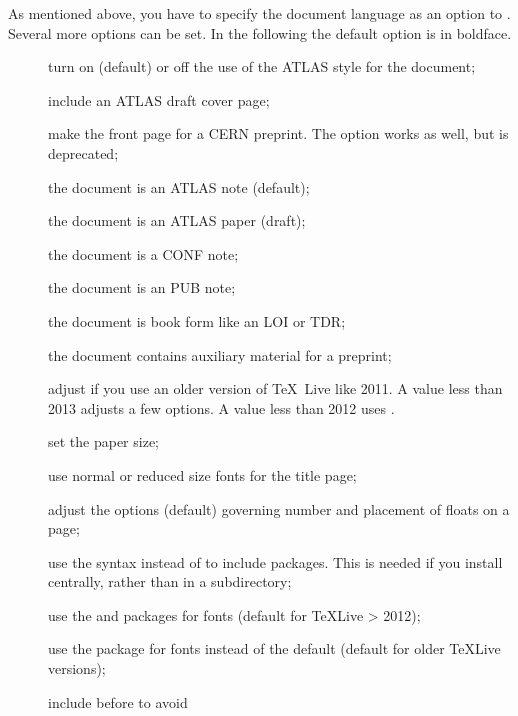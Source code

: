 As mentioned above, you have to specify the document language as an option to .
Several more options can be set.
In the following the default option is in boldface.
\begin{description}
\item[] turn on (default) or off the use of the ATLAS style for the document;
\item[] include an ATLAS draft cover page;
\item[] make the front page for a CERN preprint.
  The option  works as well, but is deprecated;
\item[] the document is an ATLAS note (default);
\item[] the document is an ATLAS paper (draft);
\item[] the document is a CONF note;
\item[] the document is an PUB note;
\item[] the document is book form like an LOI or TDR;
\item[] the document contains auxiliary material for a preprint;
\item[] adjust if you use an older version of \TeX\ Live like 2011.
  A value less than 2013 adjusts a few  options.
  A value less than 2012 uses .
\item[] set the paper size;
\item[] use normal or reduced size fonts for the title page;
\item[] adjust the options (default) governing number and placement of floats on a page;
\item[] use the syntax 
  instead of  to include packages.
  This is needed if you install  centrally,
  rather than in a  subdirectory;
\item[] use the  and  packages for fonts 
  (default for \TeX Live > 2012);
\item[] use the  package for fonts instead of the default
  (default for older \TeX Live versions);
\item[] include  before  to avoid

\end{description}
